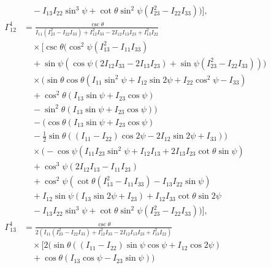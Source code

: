 \documentclass[lineno, pdflatex,sn-mathphys-ay]{sn-jnl}
\theoremstyle{thmstyleone}%
\theoremstyle{thmstyletwo}%
\theoremstyle{thmstylethree}%
\begin{document}
\begin{appendices}
\begin{align}
    &\quad -I_{13} I_{22} \sin ^3\psi+\cot \theta \sin ^2\psi \left(I_{23}^2-I_{22} I_{33}\right)\bigg) \bigg], \nonumber \\
    \Gamma^{1}_{12} &= \frac{\csc \theta}{I_{11} \left(I_{23}^2-I_{22} I_{33}\right)+I_{12}^2 I_{33}-2 I_{12} I_{13} I_{23}+I_{13}^2 I_{22}} \nonumber \\
    &\quad \times \bigg[ \csc \theta \Big(\cos ^2\psi \left(I_{13}^2-I_{11} I_{33}\right) \nonumber \\
    &\quad +\sin \psi \left(\cos \psi (2 I_{12} I_{33}-2 I_{13} I_{23})+\sin \psi \left(I_{23}^2-I_{22} I_{33}\right)\right)\Big) \nonumber \\
    &\quad \times \bigg(\sin \theta \cos \theta \left(I_{11} \sin ^2\psi+I_{12} \sin 2\psi+I_{22} \cos ^2\psi-I_{33}\right) \nonumber \\
    &\quad +\cos ^2\theta (I_{13} \sin \psi+I_{23} \cos \psi) \nonumber \\
    &\quad -\sin ^2\theta (I_{13} \sin \psi+I_{23} \cos \psi)\bigg) \nonumber \\
    &\quad -\bigg(\cos \theta (I_{13} \sin \psi+I_{23} \cos \psi) \nonumber \\
    &\quad -\frac{1}{2} \sin \theta ((I_{11}-I_{22}) \cos 2\psi-2 I_{12} \sin 2\psi+I_{33})\bigg) \nonumber \\
    &\quad \times \bigg(-\cos \psi \left(I_{11} I_{23} \sin ^2\psi+I_{12} I_{13}+2 I_{13} I_{23} \cot \theta \sin \psi\right) \nonumber \\
    &\quad +\cos ^3\psi (2 I_{12} I_{13}-I_{11} I_{23}) \nonumber \\
    &\quad +\cos ^2\psi \left(\cot \theta \left(I_{13}^2-I_{11} I_{33}\right)-I_{13} I_{22} \sin \psi\right) \nonumber \\
    &\quad +I_{12} \sin \psi (I_{13} \sin 2\psi+I_{23}) +I_{12} I_{33} \cot \theta \sin 2\psi \nonumber \\
    &\quad -I_{13} I_{22} \sin ^3\psi+\cot \theta \sin ^2\psi \left(I_{23}^2-I_{22} I_{33}\right)\bigg) \bigg], \nonumber \\
    \Gamma^{1}_{13} &= \frac{\csc \theta}{2 \left(I_{11} \left(I_{23}^2-I_{22} I_{33}\right)+I_{12}^2 I_{33}-2 I_{12} I_{13} I_{23}+I_{13}^2 I_{22}\right)} \nonumber \\
    &\quad \times \bigg[ 2 \Big(\sin \theta ((I_{11}-I_{22}) \sin \psi \cos \psi+I_{12} \cos 2\psi) \nonumber \\
    &\quad +\cos \theta (I_{13} \cos \psi-I_{23} \sin \psi)\Big) \nonumber \\

\end{align}
\end{appendices}
\end{document}
